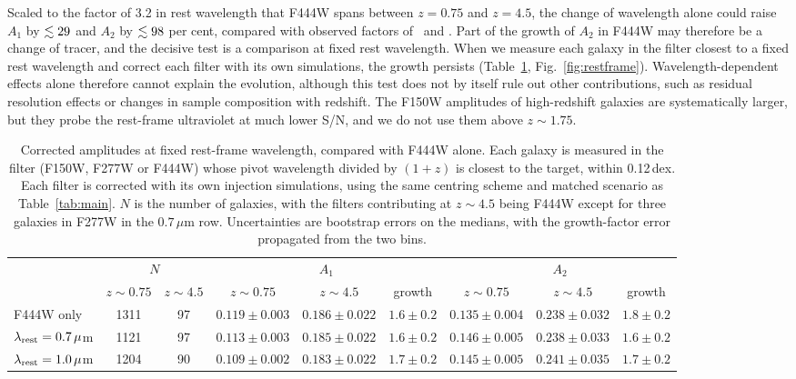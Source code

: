 \documentclass[fleqn,usenatbib]{mnras}
\begin{document}
Scaled to the factor of 3.2 in rest wavelength that F444W spans between
$z=0.75$ and $z=4.5$, the change of wavelength alone could raise $A_1$ by
$\lesssim29$ and $A_2$ by $\lesssim98$ per cent,
compared with observed factors of \numAOneGrowth\ and \numATwoGrowth. Part of
the growth of $A_2$ in F444W may therefore be a change of tracer, and the
decisive test is a comparison at fixed rest wavelength. When we measure each
galaxy in the filter closest to a fixed rest wavelength and correct each filter
with its own simulations, the growth persists (Table~\ref{tab:restframe},
Fig.~\ref{fig:restframe}). Wavelength-dependent effects alone therefore cannot
explain the evolution, although this test does not by itself rule out other
contributions, such as residual resolution effects or changes in sample
composition with redshift. The F150W amplitudes of high-redshift galaxies are
systematically larger, but they probe the rest-frame ultraviolet at much lower
S/N, and we do not use them above $z\sim1.75$.

\begin{table}
\centering
\caption{Corrected amplitudes at fixed rest-frame wavelength,
compared with F444W alone. Each galaxy is measured in the filter (F150W,
F277W or F444W) whose pivot wavelength divided by $(1+z)$ is closest to
the target, within 0.12\,dex. Each filter is corrected with its own
injection simulations, using the same centring scheme and matched
scenario as Table~\ref{tab:main}. $N$ is the number of galaxies, with
the filters contributing at $z\sim4.5$ being F444W except for three galaxies in
F277W in the $0.7\,\mu$m row. Uncertainties are bootstrap errors on the medians,
with the growth-factor error propagated from the two bins.}
\label{tab:restframe}
\small
\begin{tabular}{lcccccccc}
\hline
{} & \multicolumn{2}{c}{$N$} & \multicolumn{3}{c}{$A_1$} &
\multicolumn{3}{c}{$A_2$}\\
{} & {$z\sim0.75$} & {$z\sim4.5$} &
{$z\sim0.75$} & {$z\sim4.5$} & {growth} &
{$z\sim0.75$} & {$z\sim4.5$} & {growth}
\\
\hline
F444W only & 1311 & 97 & $0.119\pm0.003$ & $0.186\pm0.022$ & $1.6\pm0.2$ & $0.135\pm0.004$ & $0.238\pm0.032$ & $1.8\pm0.2$\\
$\lambda_{\rm rest}=0.7\,\mu$m & 1121 & 97 & $0.113\pm0.003$ & $0.185\pm0.022$ & $1.6\pm0.2$ & $0.146\pm0.005$ & $0.238\pm0.033$ & $1.6\pm0.2$\\
$\lambda_{\rm rest}=1.0\,\mu$m & 1204 & 90 & $0.109\pm0.002$ & $0.183\pm0.022$ & $1.7\pm0.2$ & $0.145\pm0.005$ & $0.241\pm0.035$ & $1.7\pm0.2$\\
\hline
\end{tabular}
\end{table}
\end{document}
